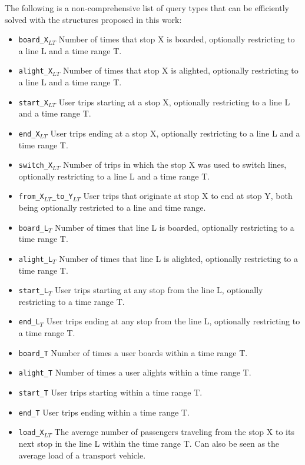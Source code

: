 \documentclass[runningheads]{llncs}
\begin{document}
The following is a non-comprehensive list of query types that can be efficiently solved with the structures proposed in this work:
\begin{itemize}
    \item \texttt{board\_X$_{LT}$} Number of times that stop X is boarded, optionally restricting to a line L and a time range T.
    \item \texttt{alight\_X$_{LT}$} Number of times that stop X is alighted, optionally restricting to a line L and a time range T.
    \item \texttt{start\_X$_{LT}$} User trips starting at a stop X, optionally restricting to a line L and a time range T.
    \item \texttt{end\_X$_{LT}$} User trips ending at a stop X, optionally restricting to a line L and a time range T.
    \item \texttt{switch\_X$_{LT}$} Number of trips in which the stop X was used to switch lines, optionally restricting to a line L and a time range T.
    \item \texttt{from\_X$_{LT}$\_to\_Y$_{LT}$} User trips that originate at stop X to end at stop Y, both being optionally restricted to a line and time range.
    \item \texttt{board\_L$_T$}  Number of times that line L is boarded, optionally restricting to a time range T.
    \item \texttt{alight\_L$_T$} Number of times that line L is alighted, optionally restricting to a time range T.
    \item \texttt{start\_L$_T$} User trips starting at any stop from the line L, optionally restricting to a time range T.
    \item \texttt{end\_L$_T$} User trips ending at any stop from the line L, optionally restricting to a time range T.
    \item \texttt{board\_T} Number of times a user boards within a time range T.
    \item \texttt{alight\_T} Number of times a user alights within a time range T.
    \item \texttt{start\_T} User trips starting within a time range T.
    \item \texttt{end\_T} User trips ending within a time range T.
    \item \texttt{load\_X$_{LT}$} The average number of passengers traveling from the stop X to its next stop in the line L within the time range T. Can also be seen as the average load of a transport vehicle.

\end{itemize}
\end{document}
